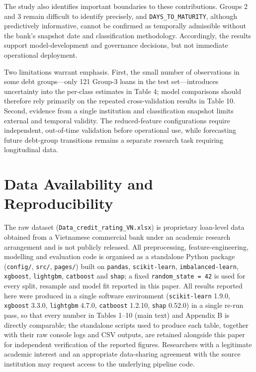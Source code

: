 \documentclass[11pt,a4paper]{article}
\begin{document}
The study also identifies important boundaries to these contributions. Groups 2 and 3 remain difficult to identify precisely, and \texttt{DAYS\_TO\_MATURITY}, although predictively informative, cannot be confirmed as temporally admissible without the bank's snapshot date and classification methodology. Accordingly, the results support model-development and governance decisions, but not immediate operational deployment.

Two limitations warrant emphasis. First, the small number of observations in some debt groups---only 121 Group-3 loans in the test set---introduces uncertainty into the per-class estimates in Table 4; model comparisons should therefore rely primarily on the repeated cross-validation results in Table 10. Second, evidence from a single institution and classification snapshot limits external and temporal validity. The reduced-feature configurations require independent, out-of-time validation before operational use, while forecasting future debt-group transitions remains a separate research task requiring longitudinal data.

\section*{Data Availability and Reproducibility}

The raw dataset (\texttt{Data\_credit\_rating\_VN.xlsx}) is proprietary loan-level data obtained from a Vietnamese commercial bank under an academic research arrangement and is not publicly released. All preprocessing, feature-engineering, modelling and evaluation code is organised as a standalone Python package (\texttt{config/}, \texttt{src/}, \texttt{pages/}) built on \texttt{pandas}, \texttt{scikit-learn}, \texttt{imbalanced-learn}, \texttt{xgboost}, \texttt{lightgbm}, \texttt{catboost} and \texttt{shap}; a fixed \texttt{random\_state = 42} is used for every split, resample and model fit reported in this paper. All results reported here were produced in a single software environment (\texttt{scikit-learn} 1.9.0, \texttt{xgboost} 3.3.0, \texttt{lightgbm} 4.7.0, \texttt{catboost} 1.2.10, \texttt{shap} 0.52.0) in a single re-run pass, so that every number in Tables 1--10 (main text) and Appendix B is directly comparable; the standalone scripts used to produce each table, together with their raw console logs and CSV outputs, are retained alongside this paper for independent verification of the reported figures. Researchers with a legitimate academic interest and an appropriate data-sharing agreement with the source institution may request access to the underlying pipeline code.
\end{document}
